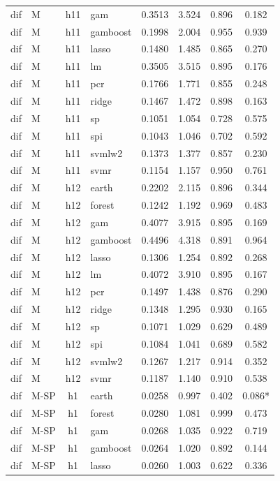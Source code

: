 \begin{ThreePartTable}
\begin{longtable}[t]{llclcccc}
dif & M & h11 & gam & 0.3513 & 3.524 & 0.896 & 0.182\\
dif & M & h11 & gamboost & 0.1998 & 2.004 & 0.955 & 0.939\\
dif & M & h11 & lasso & 0.1480 & 1.485 & 0.865 & 0.270\\
dif & M & h11 & lm & 0.3505 & 3.515 & 0.895 & 0.176\\
dif & M & h11 & pcr & 0.1766 & 1.771 & 0.855 & 0.248\\
dif & M & h11 & ridge & 0.1467 & 1.472 & 0.898 & 0.163\\
dif & M & h11 & sp & 0.1051 & 1.054 & 0.728 & 0.575\\
dif & M & h11 & spi & 0.1043 & 1.046 & 0.702 & 0.592\\
dif & M & h11 & svmlw2 & 0.1373 & 1.377 & 0.857 & 0.230\\
dif & M & h11 & svmr & 0.1154 & 1.157 & 0.950 & 0.761\\
\addlinespace
dif & M & h12 & earth & 0.2202 & 2.115 & 0.896 & 0.344\\
dif & M & h12 & forest & 0.1242 & 1.192 & 0.969 & 0.483\\
dif & M & h12 & gam & 0.4077 & 3.915 & 0.895 & 0.169\\
dif & M & h12 & gamboost & 0.4496 & 4.318 & 0.891 & 0.964\\
dif & M & h12 & lasso & 0.1306 & 1.254 & 0.892 & 0.268\\
dif & M & h12 & lm & 0.4072 & 3.910 & 0.895 & 0.167\\
dif & M & h12 & pcr & 0.1497 & 1.438 & 0.876 & 0.290\\
dif & M & h12 & ridge & 0.1348 & 1.295 & 0.930 & 0.165\\
dif & M & h12 & sp & 0.1071 & 1.029 & 0.629 & 0.489\\
dif & M & h12 & spi & 0.1084 & 1.041 & 0.689 & 0.582\\
dif & M & h12 & svmlw2 & 0.1267 & 1.217 & 0.914 & 0.352\\
dif & M & h12 & svmr & 0.1187 & 1.140 & 0.910 & 0.538\\
\addlinespace
dif & M-SP & h1 & earth & 0.0258 & 0.997 & 0.402 & 0.086*\\
dif & M-SP & h1 & forest & 0.0280 & 1.081 & 0.999 & 0.473\\
dif & M-SP & h1 & gam & 0.0268 & 1.035 & 0.922 & 0.719\\
dif & M-SP & h1 & gamboost & 0.0264 & 1.020 & 0.892 & 0.144\\
dif & M-SP & h1 & lasso & 0.0260 & 1.003 & 0.622 & 0.336\\

\end{longtable}
\end{ThreePartTable}
